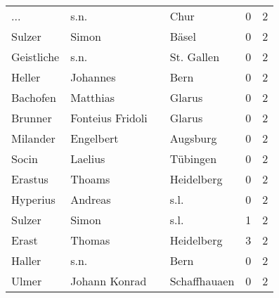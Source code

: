 \documentclass[10pt,a4paper,landscape]{article}
\begin{document}
\begin{longtable}{llllrr}
                      ... &                               s.n. &             &                                        Chur &          0 &         2 \\
                   Sulzer &                              Simon &             &                                       Bäsel &          0 &         2 \\
               Geistliche &                               s.n. &             &                                  St. Gallen &          0 &         2 \\
                   Heller &                           Johannes &             &                                        Bern &          0 &         2 \\
                 Bachofen &                           Matthias &             &                                      Glarus &          0 &         2 \\
                  Brunner &                   Fonteius Fridoli &             &                                      Glarus &          0 &         2 \\
                 Milander &                          Engelbert &             &                                    Augsburg &          0 &         2 \\
                    Socin &                            Laelius &             &                                    Tübingen &          0 &         2 \\
                  Erastus &                             Thoams &             &                                  Heidelberg &          0 &         2 \\
                 Hyperius &                            Andreas &             &                                        s.l. &          0 &         2 \\
                   Sulzer &                              Simon &             &                                        s.l. &          1 &         2 \\
                    Erast &                             Thomas &             &                                  Heidelberg &          3 &         2 \\
                   Haller &                               s.n. &             &                                        Bern &          0 &         2 \\
                    Ulmer &                      Johann Konrad &             &                                Schaffhauaen &          0 &         2 \\

\end{longtable}
\end{document}
